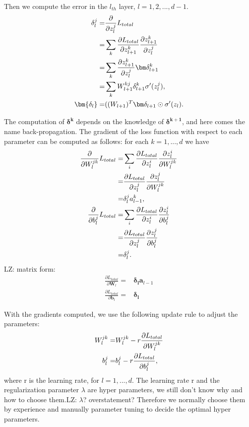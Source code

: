 Then we compute the error in the $l_{th}$ layer, $l=1,2,...,d-1$.
\begin{equation}
\aligned
\delta_l^j =& \frac{\partial}{\partial {z_l^j}}L_{total}\\
=& \sum_{k} \frac{\partial L_{total}}{\partial z_{l+1}^k}\frac{\partial z_{l+1}^k}{\partial z_l^j}\\
=& \sum_{k} \frac{\partial z_{l+1}^k}{\partial z_l^j} \bm\delta_{l+1}^k\\
=& \sum_{k} W_{l+1}^{kj} \delta_{l+1}^k \sigma'(z_l^j),\\
\bm{\delta_l} =& ((W_{l+1})^T \bm\delta_{l+1} \odot \sigma'(z_l).
\endaligned
\end{equation}


The computation of $\bm{\delta^k}$ depends on the knowledge of $\bm{\delta^{k+1}}$, and here comes the name back-propagation. The gradient of the loss function with respect to each parameter can be computed as follows: for each $k=1,...,d$ we have
\begin{equation}
\label{ebpparam}
\aligned
\frac{\partial}{\partial W_l^{jk}}L_{total}
=& \sum_{i} \frac{\partial L_{total}}{\partial z_l^i}\frac{\partial z_l^i}{\partial W_l^{jk}}\\
=& \frac{\partial L_{total}}{\partial z_l^j}\frac{\partial z_l^j}{\partial W_l^{jk}}\\
=& \delta_l^j a_{l-1}^k,\\
\frac{\partial}{\partial b_l^{j}}L_{total}
=& \sum_{i} \frac{\partial L_{total}}{\partial z_l^i}\frac{\partial z_l^i}{\partial b_l^{j}}\\
=& \frac{\partial L_{total}}{\partial z_l^j}\frac{\partial z_l^j}{\partial b_l^{j}}\\
=& \delta_l^j.
\endaligned
\end{equation}
{\color{red}LZ: matrix form:
\begin{align*}
    \frac{\partial L_{total}}{\partial \bm W_l} =& \bm{\delta_l}\bm a_{l-1}\\
    \frac{\partial L_{total}}{\partial \bm b_l} =& \bm{\delta_l}
\end{align*}}

With the gradients computed, we use the following update rule to adjust the parameters:
\begin{equation}
\label{ebpup}
\aligned
W_l^{jk} =& W_l^{jk} - r\frac{\partial L_{total}}{\partial W_l^{jk}}\\
b_l^{j} =& b_l^{j} - r\frac{\partial L_{total}}{\partial b_l^{j}},
\endaligned
\end{equation}
where r is the learning rate, for $l=1,...,d$. The learning rate r and the regularization parameter $\lambda$ are hyper parameters, we still don't know why and how to choose them.{\color{red}LZ: $\lambda$? overstatement?} Therefore we normally choose them by experience and manually parameter tuning to decide the optimal hyper parameters.



